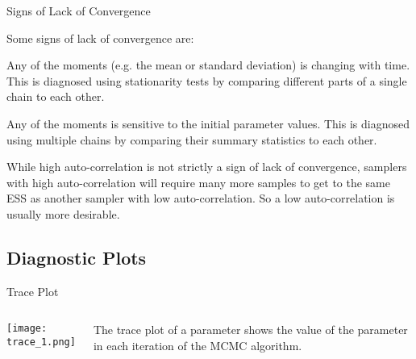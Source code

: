 \begin{frame}{Signs of Lack of Convergence}
    \begin{vfilleditems}
        \item Some signs of lack of convergence are:
            \begin{vfilleditems}
                \item Any of the moments (e.g. the mean or standard deviation) is changing with time. This is diagnosed using stationarity tests by comparing different parts of a single chain to each other.
                \item Any of the moments is sensitive to the initial parameter values. This is diagnosed using multiple chains by comparing their summary statistics to each other.
            \end{vfilleditems}
        \item While high auto-correlation is not strictly a sign of lack of convergence, samplers with high auto-correlation will require many more samples to get to the same ESS as another sampler with low auto-correlation. So a low auto-correlation is usually more desirable.
    \end{vfilleditems}
\end{frame}

\subsection{Diagnostic Plots}

\begin{frame}{Trace Plot}
    \begin{columns}
        \begin{column}{0.5\textwidth}
            \centering
            \texttt{[image: trace\_1.png]}
        \end{column}
        \begin{column}{0.5\textwidth}
            The trace plot of a parameter shows the value of the parameter in each iteration of the MCMC algorithm.
        \end{column}
    \end{columns}
\end{frame}

